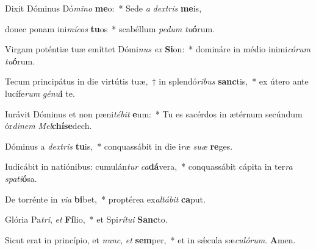 \item Dixit Dóminus Dó\textit{mino} \textbf{me}o:~* Sede \textit{a} \textit{dextris} \textbf{me}is,

\item donec ponam ini\textit{mícos} \textbf{tu}os~* scabéllum \textit{pedum} \textit{tu}\textbf{ó}rum.

\item Virgam poténtiæ tuæ emíttet Dómi\textit{nus} \textit{ex} \textbf{Si}on:~* domináre in médio inimi\textit{córum} \textit{tu}\textbf{ó}rum.

\item Tecum principátus in die virtútis tuæ,~† in splendó\textit{ribus} \textbf{sanc}tis,~* ex útero ante lucífe\textit{rum} \textit{génu}\textbf{i} te.

\item Iurávit Dóminus et non pæni\textit{tébit} \textbf{e}um:~* Tu es sacérdos in ætérnum secúndum ór\textit{dinem} \textit{Mel}\textbf{chí}\textbf{se}dech.

\item Dóminus a \textit{dextris} \textbf{tu}is,~* conquassábit in die i\textit{ræ} \textit{suæ} \textbf{re}ges.

\item Iudicábit in natiónibus: cumulán\textit{tur} \textit{ca}\textbf{dá}vera,~* conquassábit cápita in ter\textit{ra} \textit{spati}\textbf{ó}sa.

\item De torrénte in \textit{via} \textbf{bi}bet,~* proptérea ex\textit{altábit} \textbf{ca}put.

\item Glória Pa\textit{tri}, \textit{et} \textbf{Fí}lio,~* et Spi\textit{rítui} \textbf{Sanc}to.

\item Sicut erat in princípio, et \textit{nunc}, \textit{et} \textbf{sem}per,~* et in sǽcula sæ\textit{culórum}. \textbf{A}men.